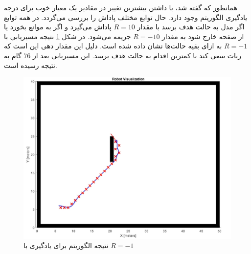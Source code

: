 همانطور که گفته شد، با داشتن بیشترین تغییر در مقادیر  یک معیار خوب برای درجه یادگیری الگوریتم وجود دارد. حال توابع مختلف پاداش را بررسی می‌گردد. در همه توابع اگر مدل به حالت هدف برسد با مقدار $R=10$ پاداش می‌گیرد و اگر به موانع بخورد یا از صفحه خارج شود به مقدار $R=-10$ جریمه می‌شود. در شکل \ref{Fig QL R=-1} نتیجه مسیریابی با $R=-1$ به ازای بقیه حالت‌ها نشان داده شده است. دلیل این مقدار دهی این است که ربات سعی کند با کمترین اقدام به حالت هدف برسد. این مسیریابی بعد از 76 گام به نتیجه رسیده است.
\begin{figure}[!h]
	\centering
	\includegraphics[scale=0.3]{Images/QL path R=-1.jpg}
	\caption{نتیجه الگوریتم  برای یادگیری با $R=-1$}\label{Fig QL R=-1}
\end{figure}

